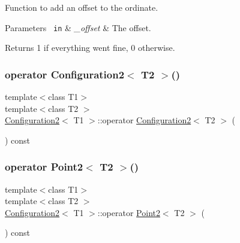 Function to add an offset to the ordinate. 


\begin{DoxyParams}[1]{Parameters}
\mbox{\texttt{ in}}  & {\em \+\_\+offset} & The offset. \\
\hline
\end{DoxyParams}
\begin{DoxyReturn}{Returns}
1 if everything went fine, 0 otherwise. 
\end{DoxyReturn}
\mbox{\label{class_configuration2_a3bc8dfea259f6d3f97f6770c09ff6526}} 
\subsubsection{\texorpdfstring{operator Configuration2$<$ T2 $>$()}{operator Configuration2< T2 >()}}
{\footnotesize\ttfamily template$<$class T1$>$ \\
template$<$class T2 $>$ \\
\mbox{\hyperlink{class_configuration2}{Configuration2}}$<$ T1 $>$\+::operator \mbox{\hyperlink{class_configuration2}{Configuration2}}$<$ T2 $>$ (\begin{DoxyParamCaption}{ }\end{DoxyParamCaption}) const\hspace{0.3cm}{\ttfamily [inline]}}

\mbox{\label{class_configuration2_a68bfa8b94c1cff3179698e00edb2890e}} 
\subsubsection{\texorpdfstring{operator Point2$<$ T2 $>$()}{operator Point2< T2 >()}}
{\footnotesize\ttfamily template$<$class T1$>$ \\
template$<$class T2 $>$ \\
\mbox{\hyperlink{class_configuration2}{Configuration2}}$<$ T1 $>$\+::operator \mbox{\hyperlink{class_point2}{Point2}}$<$ T2 $>$ (\begin{DoxyParamCaption}{ }\end{DoxyParamCaption}) const\hspace{0.3cm}{\ttfamily [inline]}}



